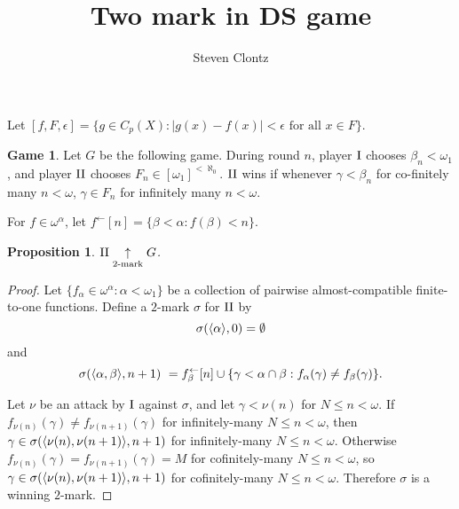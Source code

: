 \documentclass[11pt]{article}
\title{Two mark in DS game}
\author{Steven Clontz}
\theoremstyle{plain}
\newtheorem{proposition}[theorem]{Proposition}
\theoremstyle{definition}
\newtheorem{game}[theorem]{Game}
\theoremstyle{remark}
\theoremstyle{plain}
\theoremstyle{definition}
\theoremstyle{remark}
\begin{document}
\maketitle

Let 
\(
  [f,F,\epsilon]
    =
  \{g\in C_p(X):|g(x)-f(x)|<\epsilon\text{ for all }x\in F\}
\).

\begin{game}
  Let \(G\) be the following game. During round \(n\), player \(\mathrm{I}\)
  chooses \(\beta_n<\omega_1\), and player \(\mathrm{II}\) chooses
  \(F_n\in[\omega_1]^{<\aleph_0}\). \(\mathrm{II}\) wins if
  whenever \(\gamma<\beta_n\) for co-finitely many \(n<\omega\),
  \(\gamma\in F_n\) for infinitely many \(n<\omega\).
\end{game}

For \(f\in\omega^\alpha\), let 
\(f^{\leftarrow}[n]=\{\beta<\alpha:f(\beta)<n\}\).

\begin{proposition}
  \(\mathrm{II} \underset{2\text{-mark}}{\uparrow} G\).
\end{proposition}
\begin{proof}
  Let \(\{f_\alpha\in\omega^\alpha:\alpha<\omega_1\}\) be a collection
  of pairwise almost-compatible finite-to-one functions.
  Define a \(2\)-mark \(\sigma\) for \(\mathrm{II}\) by
  \[\sigma(\langle\alpha\rangle,0)=\emptyset\] and
  \[
    \sigma(\langle\alpha,\beta\rangle,n+1)\
      =
    f_\beta^\leftarrow[n]
      \cup
    \{\gamma<\alpha\cap\beta:f_\alpha(\gamma)\not=f_\beta(\gamma)\}
  .\]
  
  Let \(\nu\) be an attack by \(\mathrm{I}\) against \(\sigma\), and let
  \(\gamma<\nu(n)\) for \(N\leq n<\omega\).
  If \(f_{\nu(n)}(\gamma)\not=f_{\nu(n+1)}(\gamma)\) for infinitely-many
  \(N\leq n<\omega\), then \(\gamma\in\sigma(\langle\nu(n),\nu(n+1)\rangle,n+1)\)
  for infinitely-many \(N\leq n<\omega\).
  Otherwise \(f_{\nu(n)}(\gamma)=f_{\nu(n+1)}(\gamma)=M\) for cofinitely-many
  \(N\leq n<\omega\), so \(\gamma\in\sigma(\langle\nu(n),\nu(n+1)\rangle,n+1)\)
  for cofinitely-many \(N\leq n<\omega\). Therefore \(\sigma\) is a winning \(2\)-mark.
\end{proof}
\end{document}
